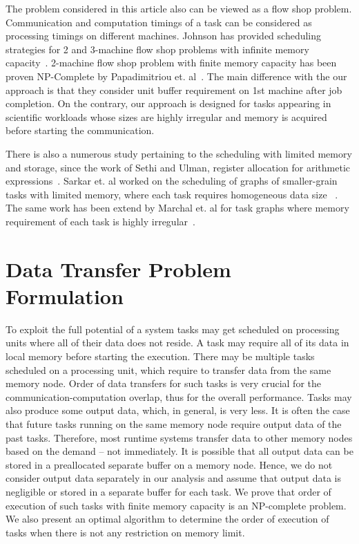 \documentclass[runningheads]{llncs} %
\begin{document}
The problem considered in this article also can be viewed as a flow shop problem. Communication and computation timings of a task can be considered as processing timings on different machines.  Johnson has provided scheduling strategies for 2 and 3-machine flow shop problems with infinite memory capacity~\cite{johnson}. 2-machine flow shop problem with finite memory capacity has been proven NP-Complete by Papadimitriou et. al~\cite{Papadimitriou:1980:FSL:322203.322213}. The main difference with the our approach is that they consider unit buffer requirement on 1st machine after job completion. On the contrary, our approach is designed for tasks appearing in scientific workloads whose sizes are highly irregular and memory is acquired before starting the communication.

There is also a numerous study pertaining to the scheduling with limited memory and storage, since the work of Sethi and Ulman, register allocation for arithmetic expressions~\cite{Sethi:1970:GOC:321607.321620}.  Sarkar et. al  worked on the scheduling of graphs of smaller-grain tasks with limited memory, where each task requires homogeneous data size ~\cite{vsarkar-pact}. The same work has been extend by Marchal et. al for task graphs where memory requirement of each task is highly irregular~\cite{loris-ipdps18}.



	\section{Data Transfer Problem Formulation}
	\label{sec:theoreticalProof}
	
	To exploit the full potential of a system tasks may get scheduled on processing
	units where all of their data does not reside. A task may require all of its data
	in local memory before starting the execution. There may be multiple tasks
	scheduled on a processing unit, which require to transfer data from the same
	memory node. Order of data transfers for such tasks is very crucial for the
	communication-computation overlap, thus for the overall performance. Tasks may
	also produce some output data, which, in general, is very less.  It is often the case that future tasks running on the same memory node require output data of the past tasks. Therefore, most runtime systems transfer data to other memory nodes based on the demand -- not immediately. It is possible that all output data can be stored in a preallocated separate buffer on a memory node. Hence, we do not consider output data separately in our analysis and assume that output data is negligible  or stored in a separate buffer for each task. We prove that order of execution of such tasks with finite memory capacity is an NP-complete problem. We also present an optimal algorithm to determine the order of execution of tasks when there is not any  restriction on memory limit.
	
\end{document}
